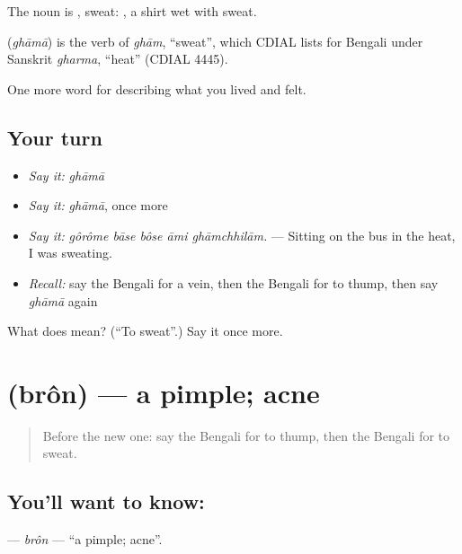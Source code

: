 The noun is , sweat:   , a shirt wet with sweat.

\begin{cousinweb}
\textbf{} (\emph{ghāmā}) is the verb of \emph{ghām}, \textquotedblleft{}sweat\textquotedblright{}, which CDIAL lists for Bengali under Sanskrit \emph{gharma}, \textquotedblleft{}heat\textquotedblright{} (CDIAL 4445).
\end{cousinweb}

\begin{grammarlens}[title={What you've built}]
One more word for describing what you lived and felt.
\end{grammarlens}

\subsection*{Your turn}
\begin{itemize}
\raggedright
  \item \emph{Say it:} \emph{ghāmā}
  \item \emph{Say it:} \emph{ghāmā}, once more
  \item \emph{Say it:} \emph{gôrôme bāse bôse āmi ghāmchhilām.} — Sitting on the bus in the heat, I was sweating.
  \item \emph{Recall:} say the Bengali for a vein, then the Bengali for to thump, then say \emph{ghāmā} again
\end{itemize}

\begin{tcolorbox}[breakable,colback=teal!4,colframe=teal!35!black,title={Before you move on}]
What does  mean? (\textquotedblleft{}To sweat\textquotedblright{}.) Say it once more.
\end{tcolorbox}
\section[\texorpdfstring{\bn{ব্রণ} (brôn)}{ব্রণ (brôn)}]{ (brôn) — a pimple; acne}

\label{lesson:BN-C469-bron}



\begin{quote}
Before the new one: say the Bengali for to thump, then the Bengali for to sweat.
\end{quote}

\subsection*{You'll want to know: }
\textbf{} — \emph{brôn} — \textquotedblleft{}a pimple; acne\textquotedblright{}.

